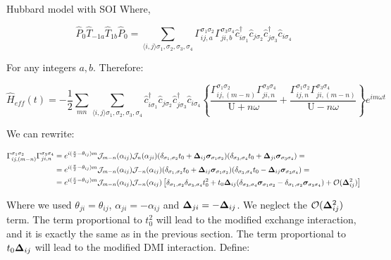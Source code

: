 \begin{section}{Hubbard model with SOI}
Where,

\begin{equation}
\hat{P}_0 \hat{T}_{-1a}\hat{T}_{1b} \hat{P}_0 = \sum_{\langle i,j \rangle \sigma_1, \sigma_2, \sigma_3, \sigma_4} \Gamma_{ij,a}^{\sigma_1\sigma_2}\Gamma_{ji,b}^{\sigma_3\sigma_4} \hat{c}_{i\sigma_1}^\dagger\hat{c}_{j\sigma_2}\hat{c}_{j\sigma_3}^\dagger\hat{c}_{i\sigma_4}
\end{equation}

For any integers $a,b$. Therefore:

\begin{equation}
\hat{H}_{eff}(t) = -\frac{1}{2}\sum_{mn} \sum_{\langle i,j \rangle \sigma_1, \sigma_2, \sigma_3, \sigma_4} \hat{c}_{i\sigma_1}^\dagger\hat{c}_{j\sigma_2}\hat{c}_{j\sigma_3}^\dagger\hat{c}_{i\sigma_4} \left\{ \frac{\Gamma_{ij,(m-n)}^{\sigma_1\sigma_2}\Gamma_{ji,n}^{\sigma_3\sigma_4}}{\text{U}+n\omega} + \frac{\Gamma_{ij,n}^{\sigma_1\sigma_2}\Gamma_{ji,(m-n)}^{\sigma_3\sigma_4}}{\text{U}-n\omega} \right\} e^{im\omega t}
\end{equation}

We can rewrite:

\begin{align*}
\Gamma_{ij,(m-n)}^{\sigma_1\sigma_2}\Gamma_{ji,n}^{\sigma_3\sigma_4} &= e^{i(\frac{\pi}{2}-\theta_{ij})m}\mathcal{J}_{m-n}(\alpha_{ij})\mathcal{J}_n(\alpha_{ji})(\delta_{\sigma_1, \sigma_2}t_0+\boldsymbol{\Delta}_{ij}\boldsymbol{\sigma}_{\sigma_1 \sigma_2})(\delta_{\sigma_3, \sigma_4}t_0+\boldsymbol{\Delta}_{ji}\boldsymbol{\sigma}_{\sigma_3 \sigma_4}) = \\
&= e^{i(\frac{\pi}{2}-\theta_{ij})m}\mathcal{J}_{m-n}(\alpha_{ij})\mathcal{J}_{-n}(\alpha_{ij})(\delta_{\sigma_1, \sigma_2}t_0+\boldsymbol{\Delta}_{ij}\boldsymbol{\sigma}_{\sigma_1 \sigma_2})(\delta_{\sigma_3, \sigma_4}t_0-\boldsymbol{\Delta}_{ij}\boldsymbol{\sigma}_{\sigma_3 \sigma_4}) = \\
&= e^{i(\frac{\pi}{2}-\theta_{ij})m}\mathcal{J}_{m-n}(\alpha_{ij})\mathcal{J}_{-n}(\alpha_{ij}) \left[ \delta_{\sigma_1, \sigma_2}\delta_{\sigma_3, \sigma_4}t_0^2+t_0\boldsymbol{\Delta}_{ij}(\delta_{\sigma_3,\sigma_4}\boldsymbol{\sigma}_{\sigma_1 \sigma_2}-\delta_{\sigma_1,\sigma_2}\boldsymbol{\sigma}_{\sigma_3 \sigma_4}) + \mathcal{O}(\boldsymbol{\Delta}_{ij}^2) \right]
\end{align*}

Where we used $\theta_{ji} = \theta_{ij}$, $\alpha_{ji} = - \alpha_{ij}$ and $\boldsymbol{\Delta}_{ji} = -\boldsymbol{\Delta}_{ij}$. We neglect the $\mathcal{O}(\boldsymbol{\Delta}_{ij}^2)$ term. The term proportional to $t_0^2$ will lead to the modified exchange interaction, and it is exactly the same as in the previous section. The term proportional to $t_0\boldsymbol{\Delta}_{ij}$ will lead to the modified DMI interaction. Define:


\end{section}
